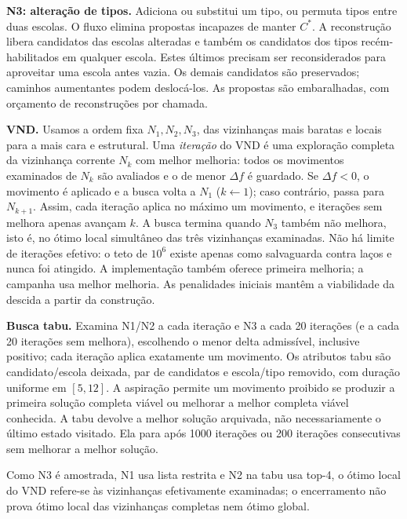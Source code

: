 \documentclass[12pt]{article}
\begin{document}
\textbf{N3: alteração de tipos.} Adiciona ou substitui um tipo, ou permuta tipos entre duas escolas. O fluxo elimina propostas incapazes de manter $C^*$. A reconstrução libera candidatos das escolas alteradas e também os candidatos dos tipos recém-habilitados em qualquer escola. Estes últimos precisam ser reconsiderados para aproveitar uma escola antes vazia. Os demais candidatos são preservados; caminhos aumentantes podem deslocá-los. As propostas são embaralhadas, com orçamento de reconstruções por chamada.

\textbf{VND.} Usamos a ordem fixa $N_1, N_2, N_3$, das vizinhanças mais baratas e locais para a mais cara e estrutural. Uma \emph{iteração} do VND é uma exploração completa da vizinhança corrente $N_k$ com melhor melhoria: todos os movimentos examinados de $N_k$ são avaliados e o de menor $\Delta f$ é guardado. Se $\Delta f<0$, o movimento é aplicado e a busca volta a $N_1$ ($k\leftarrow 1$); caso contrário, passa para $N_{k+1}$. Assim, cada iteração aplica no máximo um movimento, e iterações sem melhora apenas avançam $k$. A busca termina quando $N_3$ também não melhora, isto é, no ótimo local simultâneo das três vizinhanças examinadas. Não há limite de iterações efetivo: o teto de $10^6$ existe apenas como salvaguarda contra laços e nunca foi atingido. A implementação também oferece primeira melhoria; a campanha usa melhor melhoria. As penalidades iniciais mantêm a viabilidade da descida a partir da construção.

\textbf{Busca tabu.} Examina N1/N2 a cada iteração e N3 a cada 20 iterações (e a cada 20 iterações sem melhora), escolhendo o menor delta admissível, inclusive positivo; cada iteração aplica exatamente um movimento. Os atributos tabu são candidato/escola deixada, par de candidatos e escola/tipo removido, com duração uniforme em $[5,12]$. A aspiração permite um movimento proibido se produzir a primeira solução completa viável ou melhorar a melhor completa viável conhecida. A tabu devolve a melhor solução arquivada, não necessariamente o último estado visitado. Ela para após 1000 iterações ou 200 iterações consecutivas sem melhorar a melhor solução.

Como N3 é amostrada, N1 usa lista restrita e N2 na tabu usa top-4, o ótimo local do VND refere-se às vizinhanças efetivamente examinadas; o encerramento não prova ótimo local das vizinhanças completas nem ótimo global.
\end{document}
